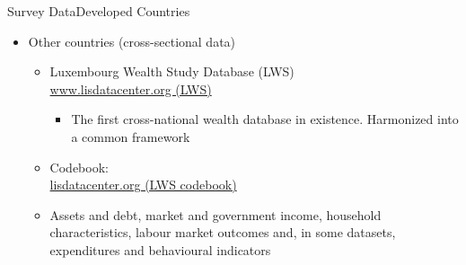 \documentclass[hyperref={pdfpagelabels=false}]{beamer}
\begin{document}
\begin{frame}{Survey Data}{Developed Countries}
	\begin{itemize} 
		\item Other countries (cross-sectional data)
		\begin{itemize} 
			\vspace{0.3cm}
			\item Luxembourg Wealth Study Database (LWS)  \\ \href{https://www.lisdatacenter.org/our-data/lws-database/}{www.lisdatacenter.org (LWS)}
			\begin{itemize}
				\item The first cross-national wealth database in existence. Harmonized into a common framework
			\end{itemize}
					\vspace{0.3cm}
			\item Codebook:  \\
			
			\href{https://www.lisdatacenter.org/wp-content/uploads/files/data-lws-variables.pdf}{lisdatacenter.org (LWS codebook)}
						\vspace{0.3cm}
			\item Assets and debt, market and government income, household characteristics, labour market outcomes and, in some datasets, expenditures and behavioural indicators
			
		\end{itemize}
		
	\end{itemize}
\end{frame}
\end{document}
